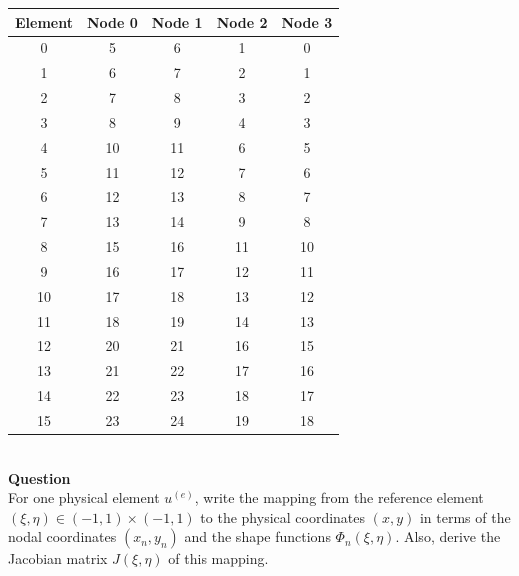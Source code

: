 \documentclass[12pt]{article}
\newcounter{question}
\newcounter{subquest}
\newcommand{\question}{
    \stepcounter{question} 
    \newpage
    \vspace{1.5em}
    \textbf{\\ \Large Question \thequestion \ }
    \vspace{.5em} 
    \setcounter{subquest}{0}\ \\}
\begin{document}
\begin{center}
    \begin{tabular}{c| c c c c}
        Element & Node 0 & Node 1 & Node 2 & Node 3 \\
        \hline
        0 & 5 & 6 & 1 & 0 \\
        1 & 6 & 7 & 2 & 1 \\
        2 & 7 & 8 & 3 & 2 \\
        3 & 8 & 9 & 4 & 3 \\
        4 & 10 & 11 & 6 & 5 \\
        5 & 11 & 12 & 7 & 6 \\
        6 & 12 & 13 & 8 & 7 \\
        7 & 13 & 14 & 9 & 8 \\
        8 & 15 & 16 & 11 & 10 \\
        9 & 16 & 17 & 12 & 11 \\
        10 & 17 & 18 & 13 & 12 \\
        11 & 18 & 19 & 14 & 13 \\
        12 & 20 & 21 & 16 & 15 \\
        13 & 21 & 22 & 17 & 16 \\
        14 & 22 & 23 & 18 & 17 \\
        15 & 23 & 24 & 19 & 18 \\
        
    \end{tabular}
\end{center}

\question
For one physical element $u^{(e)}$, write the mapping from the reference element $(\xi,\eta) \in (-1,1) \times (-1,1)$ to the physical coordinates $(x,y)$ in terms of the nodal coordinates $(x_n, y_n)$ and the shape functions $\Phi_n(\xi,\eta)$. Also, derive the Jacobian matrix $J(\xi,\eta)$ of this mapping. 
\end{document}
